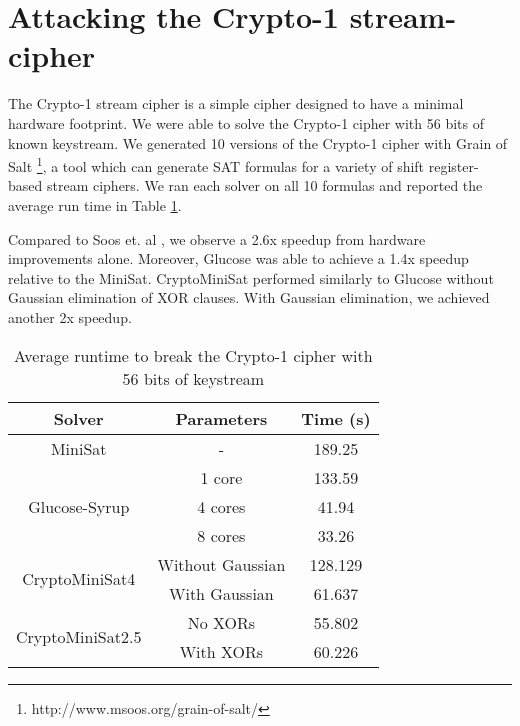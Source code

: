 \section{Attacking the Crypto-1 stream-cipher}
The Crypto-1 stream cipher is a simple cipher designed to have a minimal hardware footprint. We were able to solve the Crypto-1 cipher with 56 bits of known keystream. We generated 10 versions of the Crypto-1 cipher with Grain of Salt \footnote{http://www.msoos.org/grain-of-salt/}, a tool which can generate SAT formulas for a variety of shift register-based stream ciphers. We ran each solver on all 10 formulas and reported the average run time in Table \ref{table:crypto1:runtime}.

Compared to Soos et. al \cite{SNC09}, we observe a 2.6x speedup from hardware improvements alone. Moreover, Glucose was able to achieve a 1.4x speedup relative to the MiniSat. CryptoMiniSat performed similarly to Glucose without Gaussian elimination of XOR clauses. With Gaussian elimination, we achieved another 2x speedup. 

\begin{table}[!htbp]
	\centering
	\begin{tabular}{|c|c|c|}
		\hline
		\textbf{Solver} & \textbf{Parameters} & \textbf{Time (s)} \\
		\hline
		MiniSat & - & 189.25 \\
		\hline
		\multirow{3}{*}{Glucose-Syrup} & 1 core & 133.59 \\ \cline{2-3}
		& 4 cores & 41.94 \\ \cline{2-3}
		& 8 cores & 33.26 \\
		\hline
		
		\multirow{2}{*}{CryptoMiniSat4} & Without Gaussian & 128.129 \\ \cline{2-3} 
		& With Gaussian & 61.637 \\ \cline{2-3}
		\hline
		
		\multirow{2}{*}{CryptoMiniSat2.5} & No {XORs} & 55.802 \\ \cline{2-3} 
		& With {XORs} & 60.226 \\ \cline{2-3}
		\hline
	\end{tabular}
	
	\caption{Average runtime to break the Crypto-1 cipher with 56 bits of keystream}
	\label{table:crypto1:runtime}
\end{table}